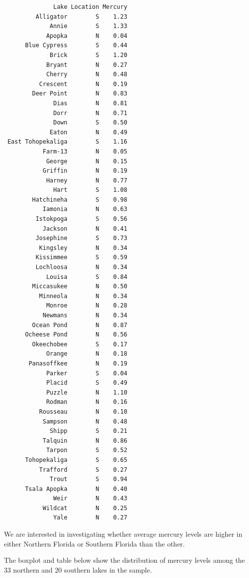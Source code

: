 \documentclass[
  letterpaper,
  DIV=11,
  numbers=noendperiod]{scrreprt}
\begin{document}
\begin{verbatim}
              Lake Location Mercury
         Alligator        S    1.23
             Annie        S    1.33
            Apopka        N    0.04
      Blue Cypress        S    0.44
             Brick        S    1.20
            Bryant        N    0.27
            Cherry        N    0.48
          Crescent        N    0.19
        Deer Point        N    0.83
              Dias        N    0.81
              Dorr        N    0.71
              Down        S    0.50
             Eaton        N    0.49
 East Tohopekaliga        S    1.16
           Farm-13        N    0.05
            George        N    0.15
           Griffin        N    0.19
            Harney        N    0.77
              Hart        S    1.08
        Hatchineha        S    0.98
           Iamonia        N    0.63
         Istokpoga        S    0.56
           Jackson        N    0.41
         Josephine        S    0.73
          Kingsley        N    0.34
         Kissimmee        S    0.59
         Lochloosa        N    0.34
            Louisa        S    0.84
        Miccasukee        N    0.50
          Minneola        N    0.34
            Monroe        N    0.28
           Newmans        N    0.34
        Ocean Pond        N    0.87
      Ocheese Pond        N    0.56
        Okeechobee        S    0.17
            Orange        N    0.18
       Panasoffkee        N    0.19
            Parker        S    0.04
            Placid        S    0.49
            Puzzle        N    1.10
            Rodman        N    0.16
          Rousseau        N    0.10
           Sampson        N    0.48
             Shipp        S    0.21
           Talquin        N    0.86
            Tarpon        S    0.52
      Tohopekaliga        S    0.65
          Trafford        S    0.27
             Trout        S    0.94
      Tsala Apopka        N    0.40
              Weir        N    0.43
           Wildcat        N    0.25
              Yale        N    0.27
\end{verbatim}

We are interested in investigating whether average mercury levels are
higher in either Northern Florida or Southern Florida than the other.

The boxplot and table below show the distribution of mercury levels
among the 33 northern and 20 southern lakes in the sample.
\end{document}
